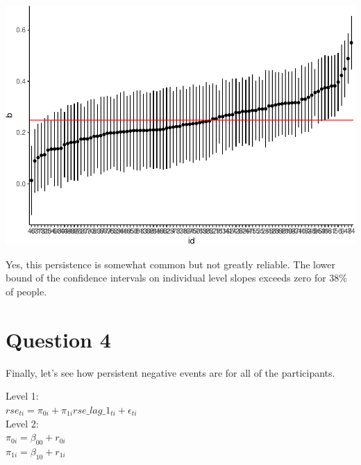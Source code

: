 \documentclass[]{article}
\newenvironment{Shaded}{\begin{snugshade}}{\end{snugshade}}
\newcommand{\KeywordTok}[1]{\textcolor[rgb]{0.13,0.29,0.53}{\textbf{#1}}}
\newcommand{\DataTypeTok}[1]{\textcolor[rgb]{0.13,0.29,0.53}{#1}}
\newcommand{\FloatTok}[1]{\textcolor[rgb]{0.00,0.00,0.81}{#1}}
\newcommand{\StringTok}[1]{\textcolor[rgb]{0.31,0.60,0.02}{#1}}
\newcommand{\OperatorTok}[1]{\textcolor[rgb]{0.81,0.36,0.00}{\textbf{#1}}}
\newcommand{\NormalTok}[1]{#1}
\begin{document}
\includegraphics{Beck_HW_7_files/figure-latex/unnamed-chunk-6-1.pdf}

\begin{Shaded}
\end{Shaded}

Yes, this persistence is somewhat common but not greatly reliable. The
lower bound of the confidence intervals on individual level slopes
exceeds zero for 38\% of people.

\section{Question 4}\label{question-4}

Finally, let's see how persistent negative events are for all of the
participants.

Level 1:\\
\(rse_{ti} = \pi_{0i} + \pi_{1i}rse\_lag\_1_{ti} + \epsilon_{ti}\)\\
Level 2:\\
\(\pi_{0i} = \beta_{00} + r_{0i}\)\\
\(\pi_{1i} = \beta_{10} + r_{1i}\)
\end{document}
